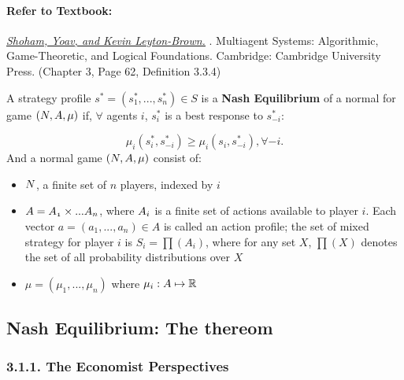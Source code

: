 \documentclass[runningheads]{llncs}
\begin{document}
\paragraph{Refer to Textbook:} 
\href{http://www.masfoundations.org/mas.pdf}{\textit{\underline{Shoham, Yoav, and Kevin Leyton-Brown.}}} \citeyear{shoham2008multiagent}. Multiagent Systems: Algorithmic, Game-Theoretic, and Logical Foundations. Cambridge: Cambridge University Press. (Chapter 3, Page 62, Definition 3.3.4)
\begin{definition} A strategy profile $s^{*}=(s_{1}^{*},...,s_{n}^{*})\in S$ is a \textbf{Nash Equilibrium} of a normal for game $(\mathnormal{N}, \mathnormal{A}, \mu)$ if, $\forall$ agents $i$, $s_{i}^{*}$ is a best response to $s_{-i}^{*}$:

$$\mu_{i}(s_{i}^{*},s_{-i}^{*}) \geq \mu_{i}(s_{i},s_{-i}^{*}), \forall -i.$$
And a normal game $(\mathnormal{N}, \mathnormal{A}, \mu)$ consist of:
\begin{itemize}
    \item $\mathnormal{N}$, a finite set of $n$ players, indexed by $i$
    \item $\mathnormal{A} =\mathnormal{A_{1}}\times ...\mathnormal{A_{n}}$, where $\mathnormal{A_{i}}$ is a finite set of actions available to player $i$. Each vector $a=(a_{1},...,a_{n})\in A$ is called an action profile; the set of mixed strategy for player $i$ is $S_{i}=\prod(A_{i})$, where for any set $X$, $\prod(X)$ denotes the set of all probability distributions over $X$
    \item $\mu = (\mu_{1},...,\mu_{n})$ where $\mu_{i}: \mathnormal{A} \mapsto \mathbb{R} $
\end{itemize}

\end{definition}

\subsection{Nash Equilibrium: The thereom}
\subsubsection{3.1.1. The Economist Perspectives}
\end{document}
